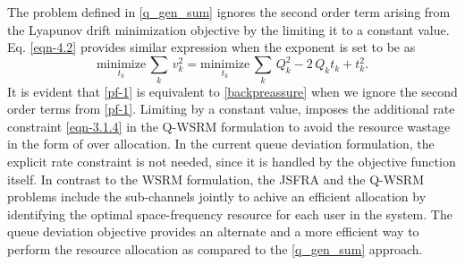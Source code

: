
The problem defined in \eqref{q_gen_sum} ignores the second order term arising from the Lyapunov drift minimization objective by the limiting it to a constant value. Eq. \eqref{eqn-4.2} provides similar expression when the exponent is set to be  as
\begin{equation}\label{pf-1}
\underset{t_k}{\text{minimize}} \, \sum_k \, v_k^2 = \underset{t_k}{\text{minimize}} \, \sum_k \, Q_k^2 - 2 \, Q_k t_k + t_k^2.
\end{equation}
It is evident that \eqref{pf-1} is equivalent to \eqref{backpreassure} when we ignore the second order terms from \eqref{pf-1}. Limiting  by a constant value, imposes the additional rate constraint \eqref{eqn-3.1.4} in the \ac{Q-WSRM} formulation to avoid the resource wastage in the form of over allocation. In the current queue deviation formulation, the explicit rate constraint is not needed, since it is handled by the objective function itself. In contrast to the \ac{WSRM} formulation, the \ac{JSFRA} and the \ac{Q-WSRM} problems include the sub-channels jointly to achive an efficient allocation by identifying the optimal space-frequency resource for each user in the system. The queue deviation objective provides an alternate and a more efficient way to perform the resource allocation as compared to the \eqref{q_gen_sum} approach.

